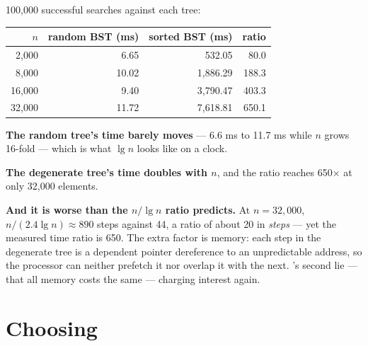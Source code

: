 \begin{worked}
100{,}000 successful searches against each tree:

\begin{center}
\begin{tabular}{@{}rrrr@{}}
\toprule
\rowcolor{primary!15}
$n$ & random BST (ms) & sorted BST (ms) & ratio \\
\midrule
 2{,}000 &  6.65 &   532.05 &  80.0 \\
 8{,}000 & 10.02 & 1{,}886.29 & 188.3 \\
16{,}000 &  9.40 & 3{,}790.47 & 403.3 \\
32{,}000 & 11.72 & 7{,}618.81 & 650.1 \\
\bottomrule
\end{tabular}
\end{center}

\smallskip
\textbf{The random tree's time barely moves} --- 6.6 ms to 11.7 ms while $n$
grows 16-fold --- which is what $\lg n$ looks like on a clock.

\smallskip
\textbf{The degenerate tree's time doubles with $n$}, and the ratio reaches
650$\times$ at only 32{,}000 elements.

\smallskip
\textbf{And it is worse than the $n/\lg n$ ratio predicts.} At $n = 32{,}000$,
$n/(2.4\lg n) \approx 890$ steps against 44, a ratio of about 20 in
\emph{steps} --- yet the measured time ratio is 650. The extra factor is memory:
each step in the degenerate tree is a dependent pointer dereference to an
unpredictable address, so the processor can neither prefetch it nor overlap it
with the next. 's second lie --- that all memory costs the same ---
charging interest again.
\end{worked}

\section{Choosing}

